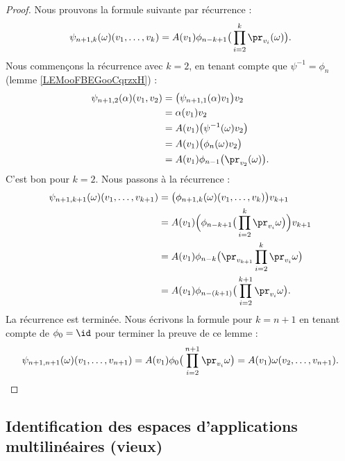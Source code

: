 \begin{proof}
    Nous prouvons la formule suivante par récurrence :
    \begin{equation}
        \psi_{n+1,k}(\omega)(v_1,\ldots, v_k)=A(v_1)\phi_{n-k+1}\big( \prod_{i=2}^k\pr_{v_i}(\omega) \big).
    \end{equation}
    Nous commençons la récurrence avec \( k=2\), en tenant compte que \( \psi^{-1}=\phi_n\) (lemme \ref{LEMooFBEGooCqrzxH}) :
    \begin{subequations}
        \begin{align}
            \psi_{n+1,2}(\alpha)(v_1,v_2)&=\big( \psi_{n+1,1}(\alpha)v_1 \big)v_2\\
            &=\alpha(v_1)v_2\\
            &=A(v_1)\big( \psi^{-1}(\omega)v_2 \big)\\
            &=A(v_1)\big( \phi_n(\omega)v_2 \big)\\
            &=A(v_1)\phi_{n-1}\big( \pr_{v_2}(\omega) \big).
        \end{align}
    \end{subequations}
    C'est bon pour \( k=2\). Nous passons à la récurrence :
    \begin{subequations}
        \begin{align}
            \psi_{n+1,k+1}(\omega)(v_1,\ldots, v_{k+1})&=\big( \phi_{n+1,k}(\omega)(v_1,\ldots, v_k) \big)v_{k+1}\\
            &=A(v_1)\Big( \phi_{n-k+1}\big( \prod_{i=2}^k\pr_{v_i}\omega \big) \Big)v_{k+1}\\
            &=A(v_1)\phi_{n-k}\big( \pr_{v_{k+1}}\prod_{i=2}^k\pr_{v_i}\omega \big)\\
            &=A(v_1)\phi_{n-(k+1)}\big( \prod_{i=2}^{k+1}\pr_{v_i}\omega \big).
        \end{align}
    \end{subequations}
    La récurrence est terminée. Nous écrivons la formule pour \( k=n+1\) en tenant compte de \( \phi_0=\id\) pour terminer la preuve de ce lemme :
    \begin{equation}
        \psi_{n+1,n+1}(\omega)(v_1,\ldots, v_{n+1})=A(v_1)\phi_0\big( \prod_{i=2}^{n+1}\pr_{v_i}\omega \big)=A(v_1)\omega(v_2,\ldots, v_{n+1}).
    \end{equation}
\end{proof}

\subsection{Identification des espaces d'applications multilinéaires (vieux)}
\label{SUBSECooXBGUooXYFZjy}

